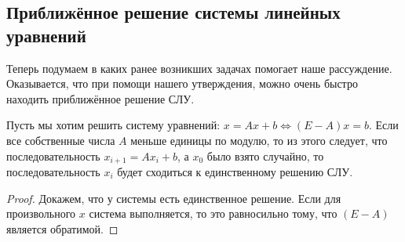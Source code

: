 \subsection{Приближённое решение системы линейных уравнений}
Теперь подумаем в каких ранее возникших задачах помогает наше рассуждение.
Оказывается, что при помощи нашего утверждения, можно очень быстро находить приближённое
решение СЛУ.

\begin{statement}
    Пусть мы хотим решить систему уравнений: $x = Ax + b \Leftrightarrow (E - A)x = b$.
    Если все собственные числа $A$ меньше единицы по модулю, то из этого следует, что последовательность
    $x_{i + 1} = Ax_i + b$, а $x_0$ было взято случайно, то последовательность $x_i$ 
    будет сходиться к единственному решению СЛУ.
\end{statement}
\begin{proof}
    Докажем, что у системы есть единственное решение. Если для произвольного $x$ система выполняется,
    то это равносильно тому, что $(E - A)$ является обратимой.
\end{proof}
